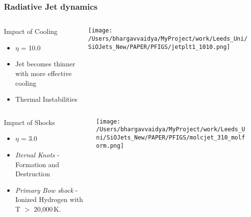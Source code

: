 \documentclass[8pt,xcolor=dvipsnames]{beamer}
\begin{document}
\begin{frame}[t]
\frametitle{Radiative Jet dynamics}
\begin{columns}[T]
    \begin{column}{.3\textwidth}
      \begin{block}{Impact of Cooling}
       \begin{itemize}
       \item $\eta$ = 10.0 \\
       \item Jet becomes thinner with more effective cooling \\
       \item Thermal Instabilities 
       \end{itemize}
       \end{block}
    \end{column}
    \begin{column}{.7\textwidth} 
     \texttt{[image: /Users/bhargavvaidya/MyProject/work/Leeds\_Uni/SiOJets\_New/PAPER/PFIGS/jetplt1\_1010.png]}
    \end{column}
  \end{columns}

\begin{columns}[T]
    \begin{column}{.3\textwidth}
       \begin{block}{Impact of Shocks}
      \begin{itemize}
      \item $\eta$ = 3.0 \\
      \item {\em Iternal Knots} - Formation and Destruction \\
      \item {\em Primary Bow shock} - Ionized Hydrogen with  T $>$ 20,000\,K.\\ 
      \end{itemize}
    \end{block}
    \end{column}
    \begin{column}{.7\textwidth} 
      \texttt{[image: /Users/bhargavvaidya/MyProject/work/Leeds\_Uni/SiOJets\_New/PAPER/PFIGS/molcjet\_310\_molform.png]}
   
    \end{column}
  \end{columns}
\end{frame}
\end{document}
